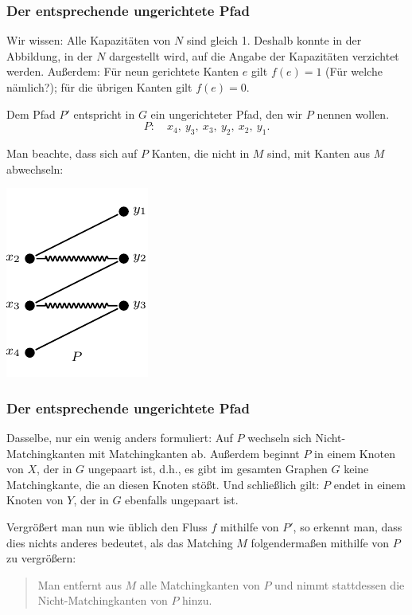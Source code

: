 \documentclass[smaller]{beamer}
\begin{document}
\begin{frame}
\frametitle{Der entsprechende ungerichtete Pfad}
 
\alert{Wir wissen:} Alle Kapazitäten von $N$ sind gleich 1. Deshalb konnte in der Abbildung, in der $N$ dargestellt wird, auf die Angabe der Kapazitäten verzichtet werden. Außerdem: Für neun gerichtete Kanten $e$ gilt $f(e)=1$ (Für welche nämlich?); für die übrigen Kanten gilt $f(e)=0$. \\ \vspace*{0.2cm}

Dem Pfad $P'$ entspricht in $G$ ein ungerichteter Pfad, den wir $P$ nennen wollen.
\[
P:\quad x_4,\ y_3,\ x_3,\ y_2,\ x_2,\ y_1.
\]

Man beachte, dass sich auf $P$ Kanten, die nicht in $M$ sind, mit Kanten aus $M$ abwechseln:

\begin{center}
\includegraphics{fig42.pdf}
\end{center}
\end{frame}

\begin{frame}
 \frametitle{Der entsprechende ungerichtete Pfad}
 Dasselbe, nur ein wenig anders formuliert: \alert{Auf $P$ wechseln sich Nicht-Matchingkanten mit Matchingkanten ab}. Außerdem beginnt $P$ in einem Knoten von $X$, der in $G$ \alert{ungepaart} ist, d.h., es gibt im gesamten Graphen $G$ keine Matchingkante, die an diesen Knoten stößt. Und schließlich gilt: $P$ endet in einem Knoten von $Y$, der in $G$ ebenfalls ungepaart ist. \\ \vspace*{0.2cm}

Vergrößert man nun wie üblich den Fluss $f$ mithilfe von $P'$, so erkennt man, dass dies nichts anderes bedeutet, als das Matching $M$ folgendermaßen mithilfe von $P$ zu vergrößern: \\ \vspace*{0.2cm}

\begin{quote}
\alert{Man entfernt aus $M$ alle Matchingkanten von $P$ und nimmt stattdessen die Nicht-Matchingkanten von $P$ hinzu}.
\end{quote}\label{page:11:5}
\end{frame}
\end{document}
